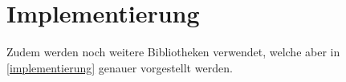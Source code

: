 \chapter{Implementierung}
\label{implementierung}



Zudem werden noch weitere Bibliotheken verwendet, welche aber in \autoref{implementierung} genauer vorgestellt werden. 